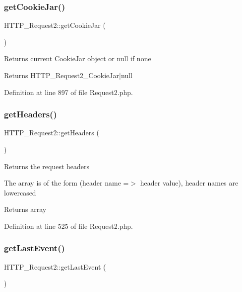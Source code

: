 \subsubsection{\texorpdfstring{get\+Cookie\+Jar()}{getCookieJar()}}
{\footnotesize\ttfamily H\+T\+T\+P\+\_\+\+Request2\+::get\+Cookie\+Jar (\begin{DoxyParamCaption}{ }\end{DoxyParamCaption})}

Returns current Cookie\+Jar object or null if none

\begin{DoxyReturn}{Returns}
H\+T\+T\+P\+\_\+\+Request2\+\_\+\+Cookie\+Jar$\vert$null 
\end{DoxyReturn}


Definition at line 897 of file Request2.\+php.

\mbox{\label{classHTTP__Request2_a49ae39a8a6531b205b15496e42b994cf}} 
\subsubsection{\texorpdfstring{get\+Headers()}{getHeaders()}}
{\footnotesize\ttfamily H\+T\+T\+P\+\_\+\+Request2\+::get\+Headers (\begin{DoxyParamCaption}{ }\end{DoxyParamCaption})}

Returns the request headers

The array is of the form (\textquotesingle{}header name\textquotesingle{} =$>$ \textquotesingle{}header value\textquotesingle{}), header names are lowercased

\begin{DoxyReturn}{Returns}
array 
\end{DoxyReturn}


Definition at line 525 of file Request2.\+php.

\mbox{\label{classHTTP__Request2_afe70adf8c72a426f80ce66b4170e0f61}} 
\subsubsection{\texorpdfstring{get\+Last\+Event()}{getLastEvent()}}
{\footnotesize\ttfamily H\+T\+T\+P\+\_\+\+Request2\+::get\+Last\+Event (\begin{DoxyParamCaption}{ }\end{DoxyParamCaption})}

